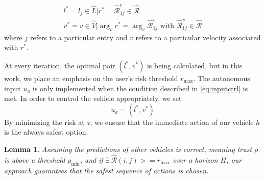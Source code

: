 \documentclass[letterpaper, 10 pt, conference]{ieeeconf}  %
\newtheorem{lemma}{Lemma}
\newcommand\NB[1]{$\spadesuit$\footnote{NB: #1}}
\begin{document}
\begin{align} \label{eq:optpair}
    l^* =  l_j\in\hat{L}\vert r^* = \hat{\mathcal{R}}_{1j}^{v}\in\hat{\mathcal{R}} \nonumber \\
    v^* =  v\in\hat{V}\vert \arg_v r^* =\arg_v\hat{\mathcal{R}}_{1j}^{v}\text{ with } \hat{\mathcal{R}}_{1j}^{v}\in\hat{\mathcal{R}}
\end{align}
where $j$ refers to a particular entry and $v$ refers to a particular velocity associated with $r^*$.


At every iteration, the optimal pair $(l^*,v^*)$ is being calculated, but in this work, we place an emphasis on the user's risk threshold $r_\max$. The autonomous input $u_a$ is only implemented when the condition described in \eqref{eq:inputctrl} is met. In order to control the vehicle appropriately, we set
\begin{equation}
u_a = (l^*,v^*)    
\end{equation}
By minimizing the risk at $\tau$, we ensure that the immediate action of our vehicle $h$ is the always safest option.

\begin{lemma}
Assuming the predictions of other vehicles is correct, meaning trust $\rho$ is above a threshold $\rho_\min$, and if $\exists~\hat{\mathcal{R}}(i,j) >= r_\max$ over a horizon $H$, our approach guarantees that the safest sequence of actions is chosen.
\end{lemma}
\end{document}
